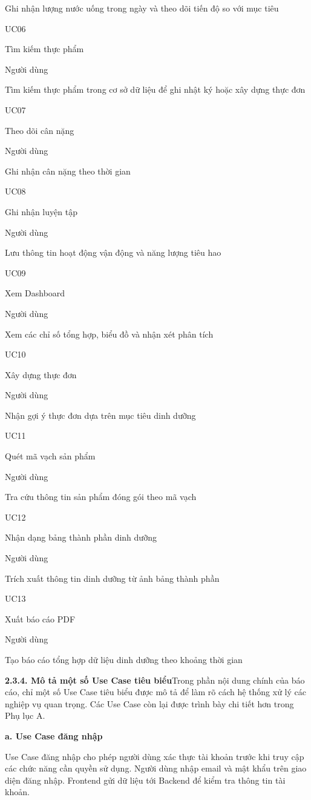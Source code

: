 Ghi nhận lượng nước uống trong ngày và theo dõi tiến độ so với mục tiêu

UC06

Tìm kiếm thực phẩm

Người dùng

Tìm kiếm thực phẩm trong cơ sở dữ liệu để ghi nhật ký hoặc xây dựng thực đơn

UC07

Theo dõi cân nặng

Người dùng

Ghi nhận cân nặng theo thời gian

UC08

Ghi nhận luyện tập

Người dùng

Lưu thông tin hoạt động vận động và năng lượng tiêu hao

UC09

Xem Dashboard

Người dùng

Xem các chỉ số tổng hợp, biểu đồ và nhận xét phân tích

UC10

Xây dựng thực đơn

Người dùng

Nhận gợi ý thực đơn dựa trên mục tiêu dinh dưỡng

UC11

Quét mã vạch sản phẩm

Người dùng

Tra cứu thông tin sản phẩm đóng gói theo mã vạch

UC12

Nhận dạng bảng thành phần dinh dưỡng

Người dùng

Trích xuất thông tin dinh dưỡng từ ảnh bảng thành phần

UC13

Xuất báo cáo PDF

Người dùng

Tạo báo cáo tổng hợp dữ liệu dinh dưỡng theo khoảng thời gian

\textbf{2.3.4. Mô tả một số Use Case tiêu biểu}Trong phần nội dung chính của báo cáo, chỉ một số Use Case tiêu biểu được mô tả để làm rõ cách hệ thống xử lý các nghiệp vụ quan trọng. Các Use Case còn lại được trình bày chi tiết hơn trong Phụ lục A.

\textbf{a. Use Case đăng nhập}

Use Case đăng nhập cho phép người dùng xác thực tài khoản trước khi truy cập các chức năng cần quyền sử dụng. Người dùng nhập email và mật khẩu trên giao diện đăng nhập. Frontend gửi dữ liệu tới Backend để kiểm tra thông tin tài khoản.

